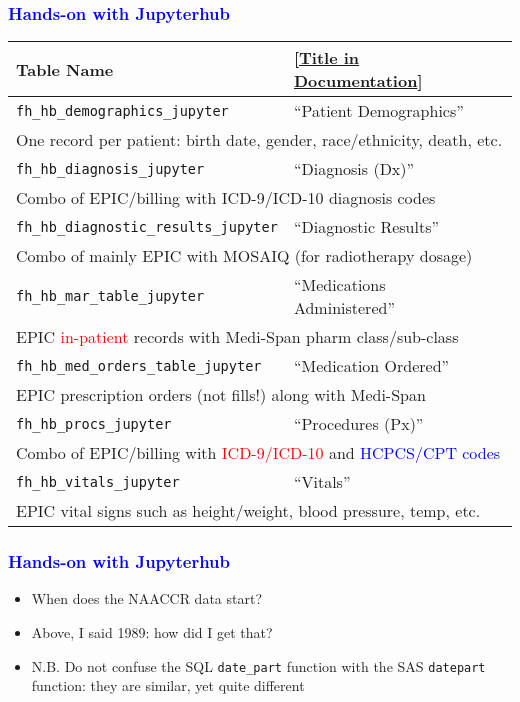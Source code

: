 \documentclass[11pt,pdftex,dvipsnames,usenames]{beamer}
\begin{document}
\begin{frame}[fragile]\frametitle{\bf\textcolor{blue}{Hands-on with Jupyterhub}}
\begin{tabular}{lll}
Table Name & 
\textcolor{PineGreen}{[\href{https://ctri.mcw.edu/wp-content/uploads/CTSI-Honest-Broker-Data-Dictionary.pdf}{Title in Documentation}]} \\ \hline
\texttt{fh\_hb\_demographics\_jupyter}       & ``Patient Demographics'' \\ 
\multicolumn{3}{l}{One record per patient: birth date, gender, 
race/ethnicity, death, etc.} \\ \hline 
\texttt{fh\_hb\_diagnosis\_jupyter}          & ``Diagnosis (Dx)'' \\
\multicolumn{3}{l}{Combo of EPIC/billing with ICD-9/ICD-10 
diagnosis codes} \\  \hline  
\texttt{fh\_hb\_diagnostic\_results\_jupyter}& ``Diagnostic Results'' \\
\multicolumn{3}{l}{Combo of mainly EPIC with MOSAIQ (for radiotherapy dosage)} \\  \hline  
\texttt{fh\_hb\_mar\_table\_jupyter}         & ``Medications Administered''\\
\multicolumn{3}{l}{EPIC \textcolor{red}{in-patient} records with Medi-Span pharm class/sub-class} \\   \hline 
\texttt{fh\_hb\_med\_orders\_table\_jupyter} & ``Medication Ordered'' \\
\multicolumn{3}{l}{EPIC prescription orders (not fills!) along with Medi-Span} \\  \hline  
\texttt{fh\_hb\_procs\_jupyter}              & ``Procedures (Px)'' \\
\multicolumn{3}{l}{Combo of EPIC/billing with 
\textcolor{red}{ICD-9/ICD-10} 
and \textcolor{blue}{HCPCS/CPT codes}} \\  \hline  
\texttt{fh\_hb\_vitals\_jupyter}             & ``Vitals'' \\
\multicolumn{3}{l}{EPIC vital signs such as height/weight, blood pressure,
temp, etc. } \\   \hline 
\end{tabular}
\end{frame}


\begin{frame}[fragile]\frametitle{\bf\textcolor{blue}{Hands-on with Jupyterhub}}
\begin{itemize}
\item When does the NAACCR data start?
\item Above, I said 1989: how did I get that?
\item N.B. Do not confuse the SQL \texttt{date\_part} function with 
the SAS \texttt{datepart} function: they are similar, yet quite different
\end{itemize}

\end{frame}
\end{document}
